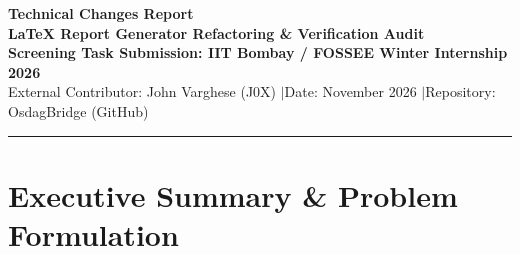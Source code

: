 \documentclass[12pt,a4paper]{article}
\begin{document}
\begin{center}
  \vspace*{0.2cm}
  {\Huge\bfseries\color{OsdagPrimary} Technical Changes Report}\\[8pt]
  {\Large\bfseries\color{OsdagAccent} LaTeX Report Generator Refactoring \& Verification Audit}\\[12pt]
  {\large\textbf{Screening Task Submission: IIT Bombay / FOSSEE Winter Internship 2026}}\\[6pt]
  {\color{OsdagMuted} External Contributor: John Varghese (J0X) \quad$\vert$\quad Date: November 2026 \quad$\vert$\quad Repository: OsdagBridge (GitHub)}\\
  \vspace{0.3cm}
  \rule{\textwidth}{1.2pt}
\end{center}

\vspace{0.2cm}

\section{Executive Summary \& Problem Formulation}
\end{document}
